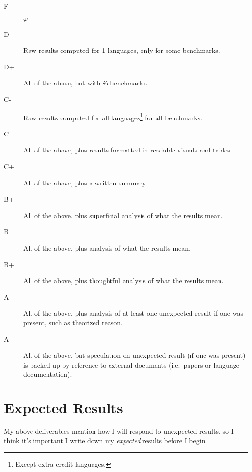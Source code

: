 \documentclass[12pt,letterpaper]{article}
\begin{document}
\begin{description}
	\item [F] $φ$
	\item [D] Raw results computed for 1 languages, only for some benchmarks.
	\item [D+] All of the above, but with ⅔ benchmarks.
	\item [C-] Raw results computed for all languages\footnote{Except extra credit
		languages.} for all benchmarks.
	\item [C] All of the above, plus results formatted in readable visuals and
		tables.
	\item [C+] All of the above, plus a written summary.
	\item [B+] All of the above, plus superficial analysis of what the results mean.
	\item [B] All of the above, plus analysis of what the results mean.
	\item [B+] All of the above, plus thoughtful analysis of what the results mean.
	\item [A-] All of the above, plus analysis of at least one unexpected
		result if one was present, such as theorized reason.
	\item [A] All of the above, but speculation on unexpected
		result (if one was present) is backed up by reference to external documents
		(i.e.\ papers or language documentation).
\end{description}

\section{Expected Results}

My above deliverables mention how I will respond to unexpected results, so I
think it's important I write down my \emph{expected} results before I begin.
\end{document}
